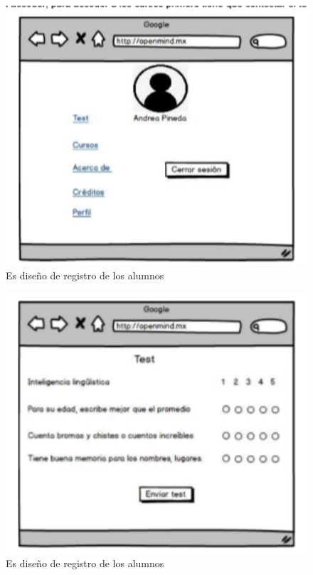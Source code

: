 \documentclass[letterpaper,oneside,openany,11pt]{book}
\begin{document}
 \begin{figure}[H]
	\centering
	\includegraphics[width=1.0\textwidth]{./Imagenes/41}
	\caption{Es diseño de registro de los alumnos}
\end{figure}

 \begin{figure}[H]
	\centering
	\includegraphics[width=1.0\textwidth]{./Imagenes/42}
	\caption{Es diseño de registro de los alumnos}
\end{figure}
\end{document}
